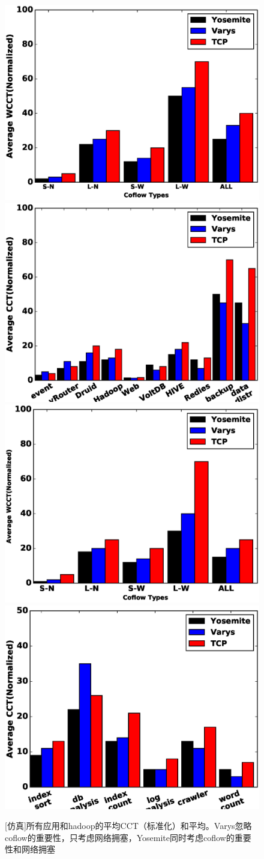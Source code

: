 \begin{figure}[h]
  \centering%
    {\includegraphics[width=0.5\columnwidth]{figures/Yosemite/figs/evaluation/ex1/evaluation_motivation1.eps}}%
      {\includegraphics[width=0.5\columnwidth]{figures/Yosemite/figs/evaluation/ex1/evaluation_motivation2.eps}}
    {\includegraphics[width=0.5\columnwidth]{figures/Yosemite/figs/evaluation/ex1/evaluation_motivation3.eps}}%
      {\includegraphics[width=0.5\columnwidth]{figures/Yosemite/figs/evaluation/ex1/evaluation_motivation4.eps}}
  \caption{[仿真]所有应用和hadoop的平均CCT（标准化）和平均。Varys忽略coflow的重要性，只考虑网络拥塞，Yosemite同时考虑coflow的重要性和网络拥塞}
  \label{Yosemite-evaluation_motivation_fig}
\end{figure}

